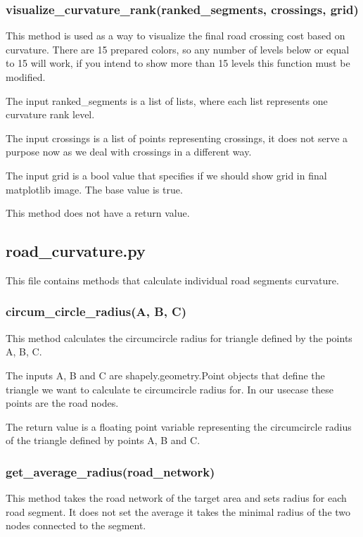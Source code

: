 \documentclass[oneside]{article}
\begin{document}
            \subsubsection{visualize\_curvature\_rank(ranked\_segments, crossings, grid)}
            This method is used as a way to visualize the final road crossing cost based on curvature. There are 15 prepared colors, so any number of levels below or equal to 15 will work, if you intend to show more than 15 levels this function must be modified.

            The input ranked\_segments is a list of lists, where each list represents one curvature rank level.

            The input crossings is a list of points representing crossings, it does not serve a purpose now as we deal with crossings in a different way.

            The input grid is a bool value that specifies if we should show grid in final matplotlib image. The base value is true.

            This method does not have a return value.

        \subsection{road\_curvature.py}
        This file contains methods that calculate individual road segments curvature.

            \subsubsection{circum\_circle\_radius(A, B, C)}
            This method calculates the circumcircle radius for triangle defined by the points A, B, C.

            The inputs A, B and C are shapely.geometry.Point objects that define the triangle we want to calculate te circumcircle radius for. In our usecase these points are the road nodes.

            The return value is a floating point variable representing the circumcircle radius of the triangle defined by points A, B and C.

            \subsubsection{get\_average\_radius(road\_network)}
            \label{sec:dtype}
            This method takes the road network of the target area and sets radius for each road segment. It does not set the average it takes the minimal radius of the two nodes connected to the segment.
\end{document}
